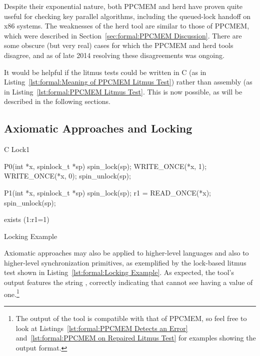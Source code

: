 Despite their exponential nature, both PPCMEM and herd have proven quite
useful for checking key parallel algorithms, including the queued-lock
handoff on x86 systems.
The weaknesses of the herd tool are similar to those of PPCMEM, which
were described in
Section~\ref{sec:formal:PPCMEM Discussion}.
There are some obscure (but very real) cases for which the PPCMEM and
herd tools disagree, and as of late 2014 resolving these disagreements
was ongoing.

It would be helpful if the litmus tests could be written in C
(as in Listing~\ref{lst:formal:Meaning of PPCMEM Litmus Test})
rather than assembly
(as in Listing~\ref{lst:formal:PPCMEM Litmus Test}.
This is now possible, as will be described in the following sections.

\subsection{Axiomatic Approaches and Locking}
\label{sec:formal:Axiomatic Approaches and Locking}

\begin{listing}[tb]
\begin{linelabel}
\begin{VerbatimL}[commandchars=\\\[\]]
C Lock1

{
}

P0(int *x, spinlock_t *sp)
{
	spin_lock(sp);
	WRITE_ONCE(*x, 1);
	WRITE_ONCE(*x, 0);
	spin_unlock(sp);
}

P1(int *x, spinlock_t *sp)
{
	spin_lock(sp);
	r1 = READ_ONCE(*x);
	spin_unlock(sp);
}

exists (1:r1=1)
\end{VerbatimL}
\end{linelabel}
\caption{Locking Example}
\label{lst:formal:Locking Example}
\end{listing}

Axiomatic approaches may also be applied to higher-level
languages and also to higher-level synchronization primitives, as
exemplified by the lock-based litmus test shown in
Listing~\ref{lst:formal:Locking Example}.
As expected, the  tool's output features the string ,
correctly indicating that  cannot see  having a value
of one.\footnote{
	The output of the  tool is compatible with that
	of PPCMEM, so feel free to look at
	Listings~\ref{lst:formal:PPCMEM Detects an Error}
	and~\ref{lst:formal:PPCMEM on Repaired Litmus Test}
	for examples showing the output format.}

